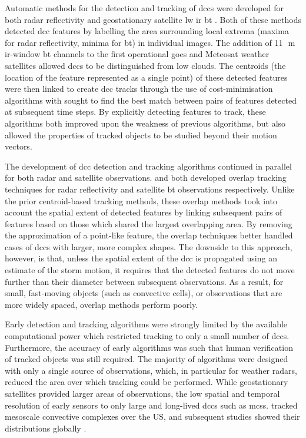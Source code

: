 Automatic methods for the detection and tracking of \acrshort{dcc}s were developed for both radar reflectivity \citep{crane_automatic_1979} and geostationary satellite \acrshort{lw} \acrfull{ir} \acrfull{bt} \citep{endlich_automatic_1981}.
Both of these methods detected \acrshort{dcc} features by labelling the area surrounding local extrema (maxima for radar reflectivity, minima for \acrshort{bt}) in individual images.
The addition of 11\,\unit{\mu m} \acrshort{ir}-window \acrshort{bt} channels to the first operational \acrshort{goes} and Meteosat weather satellites allowed \acrshort{dcc}s to be distinguished from low clouds.
The centroids (the location of the feature represented as a single point) of these detected features were then linked to create \acrshort{dcc} tracks through the use of cost-minimisation algorithms with sought to find the best match between pairs of features detected at subsequent time steps.
By explicitly detecting features to track, these algorithms both improved upon the weakness of previous algorithms, but also allowed the properties of tracked objects to be studied beyond their motion vectors.

The development of \acrshort{dcc} detection and tracking algorithms continued in parallel for both radar and satellite observations.
\citet{rosenfeld_objective_1987} and \citet{williams_satellite-observed_1987} both developed overlap tracking techniques for radar reflectivity and satellite \acrshort{bt} observations respectively.
Unlike the prior centroid-based tracking methods, these overlap methods took into account the spatial extent of detected features by linking subsequent pairs of features based on those which shared the largest overlapping area.
By removing the approximation of a point-like feature, the overlap techniques better handled cases of \acrshort{dcc}s with larger, more complex shapes.
The downside to this approach, however, is that, unless the spatial extent of the \acrshort{dcc} is propagated using an estimate of the storm motion, it requires that the detected features do not move further than their diameter between subsequent observations.
As a result, for small, fast-moving objects (such as convective cells), or observations that are more widely spaced, overlap methods perform poorly.

Early detection and tracking algorithms were strongly limited by the available computational power which restricted tracking to only a small number of \acrshort{dcc}s. 
Furthermore, the accuracy of early algorithms was such that human verification of tracked objects was still required. 
The majority of algorithms were designed with only a single source of observations, which, in particular for weather radars, reduced the area over which tracking could be performed. 
While geostationary satellites provided larger areas of observations, the low spatial and temporal resolution of early sensors to only large and long-lived \acrshort{dcc}s such as \acrshort{mcs}s. 
\citet{maddox_mesoscale_1980a} tracked mesoscale convective complexes over the US, and subsequent studies showed their distributions globally \citep{laing_global_1997}.

